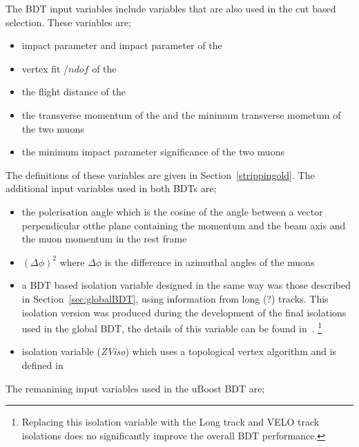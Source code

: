 The BDT input variables include variables that are also used in the cut based selection. These variables are;
\begin{itemize}
\item impact parameter and impact parameter \chisqd of the \bs
\item vertex fit \chisqd/$ndof$ of the \bs 
\item the flight distance \chisqd of the \bs
\item the transverse momentum of the \bs and the minimum transverse mometum of the two muons
\item the minimum impact parameter significance of the two muons
\end{itemize}
The definitions of these variables are given in Section~\ref{strippingold}. The additional input variables used in both BDTs are; %
\begin{itemize}
\item  the polerisation angle which is the cosine of the angle between a vector perpendicular otthe plane containing the \bs momentum and the beam axis and the muon momentum in the \bs rest frame 
\item $(\Delta \phi)^{2}$ where $\Delta \phi$ is the difference in azimuthal angles of the muons\item a BDT based isolation variable designed in the same way was those described in Section~\ref{sec:globalBDT}, using information from long (?) tracks. This isolation version was produced during the development of the final isolations used in the global BDT, the details of this variable can be found in~\cite{Archilli:1970886}. \footnote{Replacing this isolation variable with the Long track and VELO track isolations does no significantly improve the overall BDT performance.}
\item isolation variable ({\it ZViso}) which uses a topological vertex algorithm and is defined in~\cite{Morda:2120795}
\end{itemize}
The remanining input variables used in the uBoost BDT are;
